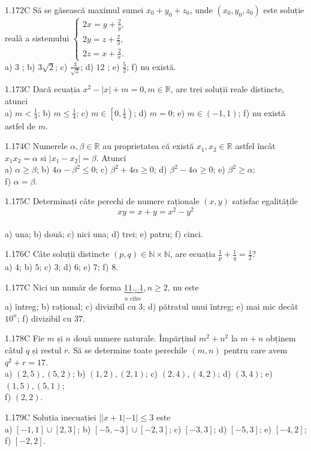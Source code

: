 \documentclass[11pt]{article}
\begin{document}
1.172C Să se găsească maximul sumei $x_{0}+y_{0}+z_{0}$, unde $\left(x_{0}, y_{0}, z_{0}\right)$ este soluție reală a sistemului $\left\{\begin{array}{l}2 x=y+\frac{2}{y}, \\ 2 y=z+\frac{2}{3}, \\ 2 z=x+\frac{2}{x} .\end{array}\right.$\\ a) $3$ ; b) $3 \sqrt{2}$; c) $\frac{3}{\sqrt{2}}$; d) $12$ ; e) $\frac{5}{2}$; f) nu există.

1.173C Dacă ecuația $x^{2}-|x|+m=0, m \in \mathbb{R}$, are trei soluții reale distincte, atunci\\ a) $m<\frac{1}{4}$; b) $m \leq \frac{1}{4}$; c) $m \in\left[0, \frac{1}{4}\right)$; d) $m=0$; e) $m \in(-1,1)$; f) nu există astfel de $m$.

1.174C Numerele $\alpha, \beta \in \mathbb{R}$ au proprietatea că există $x_{1}, x_{2} \in \mathbb{R}$ astfel încât $x_{1} x_{2}=\alpha$ si $\left|x_{1}-x_{2}\right|=\beta$. Atunci\\
a) $\alpha \geq \beta$; b) $4 \alpha-\beta^{2} \leq 0$; c) $\beta^{2}+4 \alpha \geq 0$; d) $\beta^{2}-4 \alpha \geq 0$; e) $\beta^{2} \geq \alpha$;\\ f) $\alpha=\beta$.

1.175C Determinați câte perechi de numere raționale $(x, y)$ satisfac egalitățile $$x y=x+y=x^{2}-y^{2}$$\\ a) una; b) două; c) nici una; d) trei; e) patru; f) cinci.

1.176C Câte soluții distincte $(p, q) \in \mathbb{N} \times \mathbb{N}$, are ecuația $\frac{1}{p}+\frac{1}{q}=\frac{1}{2}$?\\ a) $4$; b) $5$; c) $3$; d) $6$; e) $7$; f) $8$.

1.177C Nici un număr de forma $\underbrace{11 \ldots 1}_{n \text { cifre }}, n \geq 2$, nu este\\ a) întreg; b) rațional; c) divizibil cu $3$; d) pătratul unui întreg; e) mai mic decât $10^{n}$; f) divizibil cu $37$.

1.178C Fie $m$ și $n$ două numere naturale. Împărțind $m^{2}+n^{2}$ la $m+n$ obținem câtul $q$ și restul $r$. Să se determine toate perechile $(m, n)$ pentru care avem $q^{2}+r=17$.\\ a) $(2,5),(5,2)$; b) $(1,2),(2,1)$; c) $(2,4),(4,2)$; d) $(3,4)$; e) $(1,5),(5,1)$;\\ f) $(2,2)$.

1.179C Soluția inecuației $||x+1|-1| \leq 3$ este\\ a) $[-1,1] \cup[2,3]$; b) $[-5,-3] \cup[-2,3]$; c) $[-3,3]$; d) $[-5,3]$; e) $[-4,2]$;\\ f) $[-2,2]$.
\end{document}

